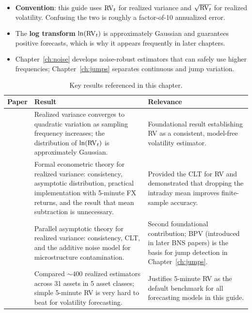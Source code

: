 \begin{itemize}[nosep]
  \item \textbf{Convention}: this guide uses $\operatorname{RV}_t$ for realized variance and $\sqrt{\operatorname{RV}_t}$ for realized volatility. Confusing the two is roughly a factor-of-10 annualized error.

  \item The \textbf{log transform} $\ln(\operatorname{RV}_t)$ is approximately Gaussian and guarantees positive forecasts, which is why it appears frequently in later chapters.

  \item Chapter~\ref{ch:noise} develops noise-robust estimators that can safely use higher frequencies; Chapter~\ref{ch:jumps} separates continuous and jump variation.
\end{itemize}


\begin{table}[htbp]
\centering
\caption{Key results referenced in this chapter.}
\label{tab:ch02-key-results}
\begin{tabular}{@{} p{4.5cm} p{6cm} p{4cm} @{}}
\toprule
\textbf{Paper} & \textbf{Result} & \textbf{Relevance} \\
\midrule
\citet{ABDL2001} &
Realized variance converges to quadratic variation as sampling frequency increases; the distribution of $\ln(\operatorname{RV}_t)$ is approximately Gaussian. &
Foundational result establishing RV as a consistent, model-free volatility estimator. \\[6pt]

\citet{ABDL2003} &
Formal econometric theory for realized variance: consistency, asymptotic distribution, practical implementation with 5-minute FX returns, and the result that mean subtraction is unnecessary. &
Provided the CLT for RV and demonstrated that dropping the intraday mean improves finite-sample accuracy. \\[6pt]

\citet{BNS2002} &
Parallel asymptotic theory for realized variance: consistency, CLT, and the additive noise model for microstructure contamination. &
Second foundational contribution; BPV (introduced in later BNS papers) is the basis for jump detection in Chapter~\ref{ch:jumps}. \\[6pt]

\citet{LPS2015} &
Compared ${\sim}400$ realized estimators across 31 assets in 5 asset classes; simple 5-minute RV is very hard to beat for volatility forecasting. &
Justifies 5-minute RV as the default benchmark for all forecasting models in this guide. \\
\bottomrule
\end{tabular}
\end{table}
